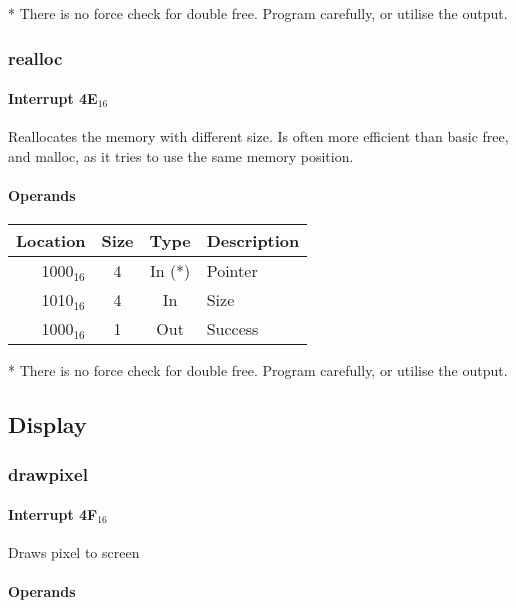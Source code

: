 \documentclass{article}
\begin{document}
* There is no force check for double free. Program carefully, or utilise the output.

\subsubsection{realloc}

\paragraph{Interrupt 4E$_{16}$}

Reallocates the memory with different size.
Is often more efficient than basic free, and malloc, as it
tries to use the same memory position.

\paragraph{Operands}

\begin{tabular}{|r|c|c|l|}
	\hline
	\textbf{Location} & \textbf{Size} & \textbf{Type} & \textbf{Description} \\
	\hline
	1000$_{16}$ & 4 & In (*) & Pointer \\
	\hline
	1010$_{16}$ & 4 & In & Size \\
	\hline
	1000$_{16}$ & 1 & Out & Success \\
	\hline
\end{tabular}

* There is no force check for double free. Program carefully, or utilise the output.

\subsection{Display}

\subsubsection{drawpixel}

\paragraph{Interrupt 4F$_{16}$}

Draws pixel to screen

\paragraph{Operands}
\end{document}
